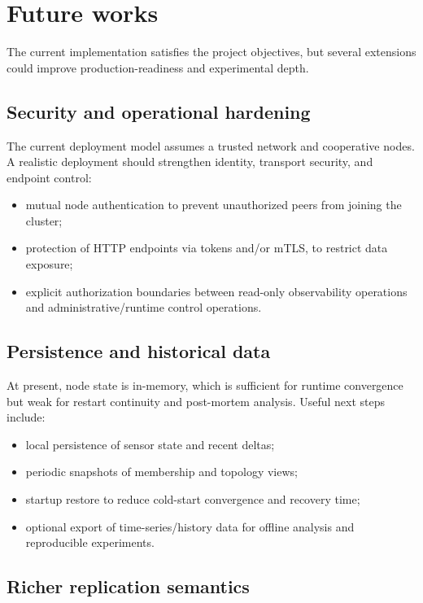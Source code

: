 \section{Future works}\label{future-works}

The current implementation satisfies the project objectives, but several extensions could improve production-readiness and experimental depth.

\subsection{Security and operational hardening}

The current deployment model assumes a trusted network and cooperative nodes.
A realistic deployment should strengthen identity, transport security, and endpoint control:
\begin{itemize}
  \item mutual node authentication to prevent unauthorized peers from joining the cluster;
  \item protection of HTTP endpoints via tokens and/or mTLS, to restrict data exposure;
  \item explicit authorization boundaries between read-only observability operations and administrative/runtime control operations.
\end{itemize}

\subsection{Persistence and historical data}

At present, node state is in-memory, which is sufficient for runtime convergence but weak for restart continuity and post-mortem analysis.
Useful next steps include:
\begin{itemize}
  \item local persistence of sensor state and recent deltas;
  \item periodic snapshots of membership and topology views;
  \item startup restore to reduce cold-start convergence and recovery time;
  \item optional export of time-series/history data for offline analysis and reproducible experiments.
\end{itemize}

\subsection{Richer replication semantics}

